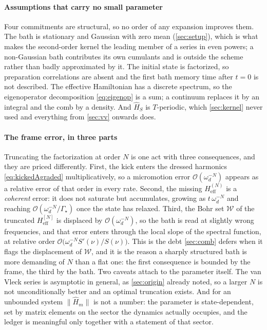 \documentclass[a4paper,11pt]{article}
\newcommand{\eff}{\mathrm{eff}}
\begin{document}
\paragraph{Assumptions that carry no small parameter}
Four commitments are structural, so no order of any expansion improves them. The bath is stationary and Gaussian with zero mean (\cref{sec:setup}), which is what makes the second-order kernel the leading member of a series in even powers; a non-Gaussian bath contributes its own cumulants and is outside the scheme rather than badly approximated by it. The initial state is factorized, so preparation correlations are absent and the first bath memory time after $t=0$ is not described. The effective Hamiltonian has a discrete spectrum, so the eigenoperator decomposition \eqref{eq:eigenop} is a sum; a continuum replaces it by an integral and the comb by a density. And $\hat H_S$ is $T$-periodic, which \cref{sec:kernel} never used and everything from \cref{sec:vv} onwards does.

\paragraph{The frame error, in three parts}
Truncating the factorization at order $N$ is one act with three consequences, and they are priced differently. First, the kick enters the dressed harmonics \eqref{eq:kickedAgraded} multiplicatively, so a micromotion error $\mathcal O(\omega_d^{-N})$ appears as a relative error of that order in every rate. Second, the missing $H_\eff^{(N)}$ is a \emph{coherent} error: it does not saturate but accumulates, growing as $t\,\omega_d^{-N}$ and reaching $\mathcal O(\omega_d^{-N}/\Gamma_{\!\star})$ once the state has relaxed. Third, the Bohr set $\mathcal W$ of the truncated $H_\eff^{[N]}$ is displaced by $\mathcal O(\omega_d^{-N})$, so the bath is read at slightly wrong frequencies, and that error enters through the local slope of the spectral function, at relative order $\mathcal O\big(\omega_d^{-N}S'(\nu)/S(\nu)\big)$. This is the debt \cref{sec:comb} defers when it flags the displacement of $\mathcal W$, and it is the reason a sharply structured bath is more demanding of $N$ than a flat one: the first consequence is bounded by the frame, the third by the bath. Two caveats attach to the parameter itself. The van Vleck series is asymptotic in general, as \cref{sec:origin} already noted, so a larger $N$ is not unconditionally better and an optimal truncation exists. And for an unbounded system $\lVert\hat H_m\rVert$ is not a number: the parameter is state-dependent, set by matrix elements on the sector the dynamics actually occupies, and the ledger is meaningful only together with a statement of that sector.
\end{document}
